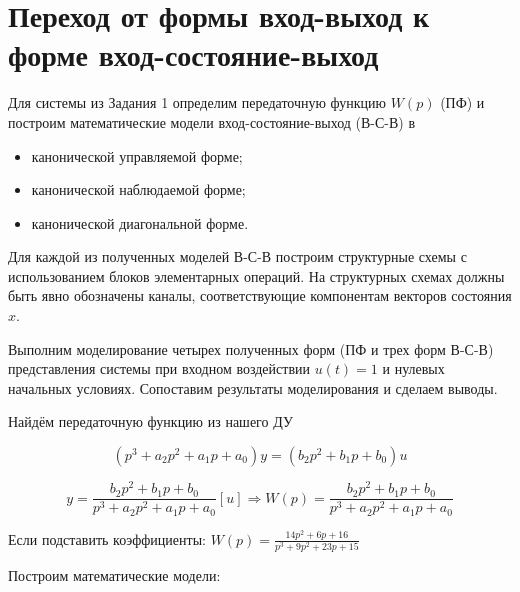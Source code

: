 \newpage
\section{Переход от формы вход-выход к форме вход-состояние-выход}

Для системы из Задания 1 определим передаточную функцию $W(p)$ (ПФ) и построим математические модели вход-состояние-выход (В-С-В) в
\begin{itemize}
    \item канонической управляемой форме;
    \item канонической наблюдаемой форме;
    \item канонической диагональной форме.
\end{itemize}

Для каждой из полученных моделей В-С-В построим структурные схемы с использованием блоков элементарных операций. На структурных схемах должны быть явно обозначены каналы, соответствующие компонентам векторов состояния $x$.

Выполним моделирование четырех полученных форм (ПФ и трех форм В-С-В) представления системы при входном воздействии $u(t) = 1$ и нулевых начальных условиях. Сопоставим результаты моделирования и сделаем выводы.


\begin{par}
\begin{flushleft}
Найдём передаточную функцию из нашего ДУ
\end{flushleft}
\end{par}

$$(p^3 +a_2 p^2 +a_1 p+a_0 )y=(b_2 p^2 +b_1 p+b_0 )u$$


\begin{par}
$$y=\frac{b_2 p^2 +b_1 p+b_0 }{p^3 +a_2 p^2 +a_1 p+a_0 }[u]\Rightarrow W(p)=\frac{b_2 p^2 +b_1 p+b_0 }{p^3 +a_2 p^2 +a_1 p+a_0 }$$
\end{par}

\begin{par}
\begin{flushleft}
Если подставить коэффициенты: $W(p)=\frac{14p^2 +6p+16}{p^3 +9p^2 +23p+15}$
\end{flushleft}
\end{par}

\begin{par}
\begin{flushleft}
Построим математические модели:
\end{flushleft}
\end{par}


